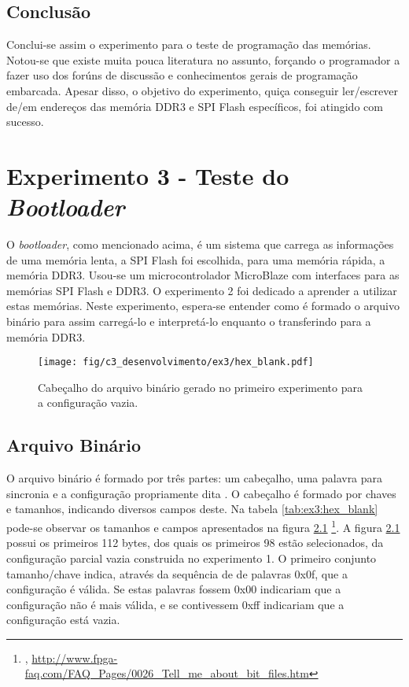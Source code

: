 \documentclass[11pt,a4paper,oneside]{book}
\begin{document}
\section{Conclusão}
Conclui-se assim o experimento para o teste de programação das memórias.
Notou-se que existe muita pouca literatura no assunto, forçando o programador a fazer uso dos forúns de discussão e conhecimentos gerais de programação embarcada.
Apesar disso, o objetivo do experimento, quiça conseguir ler/escrever de/em endereços das memória DDR3 e SPI Flash específicos, foi atingido com sucesso.

\chapter{Experimento 3 - Teste do \textit{Bootloader}}
O \textit{bootloader}, como mencionado acima, é um sistema que carrega as informações de uma memória lenta, a SPI Flash foi escolhida, para uma memória rápida, a memória DDR3.
Usou-se um microcontrolador MicroBlaze com interfaces para as memórias SPI Flash e DDR3.
O experimento 2 foi dedicado a aprender a utilizar estas memórias.
Neste experimento, espera-se entender como é formado o arquivo binário para assim carregá-lo e interpretá-lo enquanto o transferindo para a memória DDR3.

\begin{figure}[htp]
\centering
\texttt{[image: fig/c3\_desenvolvimento/ex3/hex\_blank.pdf]}
\caption{Cabeçalho do arquivo binário gerado no primeiro experimento para a configuração vazia.}
\label{fig:ex3:hex_blank}
\end{figure}

\section{Arquivo Binário}
\label{sec:binario}
O arquivo binário é formado por três partes: um cabeçalho, uma palavra para sincronia e a configuração propriamente dita \cite{ug470, xapp583}.
O cabeçalho é formado por chaves e tamanhos, indicando diversos campos deste.
Na tabela \ref{tab:ex3:hex_blank} pode-se observar os tamanhos e campos apresentados na figura \ref{fig:ex3:hex_blank} \footnote{, \url{http://www.fpga-faq.com/FAQ_Pages/0026_Tell_me_about_bit_files.htm}}.
A figura \ref{fig:ex3:hex_blank} possui os primeiros 112 bytes, dos quais os primeiros 98 estão selecionados, da configuração parcial vazia construida no experimento 1.
O primeiro conjunto tamanho/chave indica, através da sequência de de palavras 0x0f, que a configuração é válida.
Se estas palavras fossem 0x00 indicariam que a configuração não é mais válida, e se contivessem 0xff indicariam que a configuração está vazia.
\end{document}
